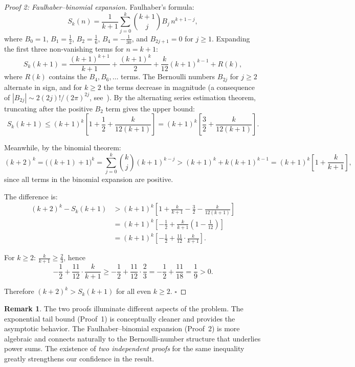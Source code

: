 \documentclass[12pt,a4paper]{article}
\theoremstyle{plain}
\theoremstyle{definition}
\newtheorem{remark}[theorem]{Remark}
\begin{document}
\begin{proof}[Proof 2: Faulhaber--binomial expansion]
  Faulhaber's formula:
  \[
    S_k(n) = \frac{1}{k+1} \sum_{j=0}^{k} \binom{k+1}{j} B_j \, n^{k+1-j},
  \]
  where $B_0 = 1$, $B_1 = \frac{1}{2}$, $B_2 = \frac{1}{6}$, $B_4 = -\frac{1}{30}$,
  and $B_{2j+1} = 0$ for $j \ge 1$.  Expanding the first three non-vanishing
  terms for $n = k+1$:
  \[
    S_k(k+1) = \frac{(k+1)^{k+1}}{k+1}
             + \frac{(k+1)^k}{2}
             + \frac{k}{12}(k+1)^{k-1} + R(k),
  \]
  where $R(k)$ contains the $B_4, B_6, \dots$ terms.  The Bernoulli numbers
  $B_{2j}$ for $j \ge 2$ alternate in sign, and for $k \ge 2$ the terms
  decrease in magnitude (a consequence of $|B_{2j}| \sim
  2(2j)!/(2\pi)^{2j}$, see~\cite{Euler}).  By the alternating series
  estimation theorem, truncating after the positive $B_2$ term gives the upper bound:
  \[
    S_k(k+1) \le (k+1)^k
      \left[1 + \frac{1}{2} + \frac{k}{12(k+1)}\right]
    = (k+1)^k \left[\frac{3}{2} + \frac{k}{12(k+1)}\right].
  \]

  Meanwhile, by the binomial theorem:
  \[
    (k+2)^k = \bigl((k+1) + 1\bigr)^k
    = \sum_{j=0}^{k} \binom{k}{j} (k+1)^{k-j}
    > (k+1)^k + k(k+1)^{k-1}
    = (k+1)^k \left[1 + \frac{k}{k+1}\right],
  \]
  since all terms in the binomial expansion are positive.

  The difference is:
  \begin{align*}
    (k+2)^k - S_k(k+1)
    &> (k+1)^k \left[1 + \frac{k}{k+1}
                      - \frac{3}{2}
                      - \frac{k}{12(k+1)}\right] \\[4pt]
    &= (k+1)^k \left[-\frac{1}{2}
                      + \frac{k}{k+1}\!\left(1 - \frac{1}{12}\right)\right] \\[4pt]
    &= (k+1)^k \left[-\frac{1}{2}
                      + \frac{11}{12} \cdot \frac{k}{k+1}\right].
  \end{align*}

  For $k \ge 2$: $\frac{k}{k+1} \ge \frac{2}{3}$, hence
  \[
    -\frac{1}{2} + \frac{11}{12} \cdot \frac{k}{k+1}
    \ge -\frac{1}{2} + \frac{11}{12} \cdot \frac{2}{3}
    = -\frac{1}{2} + \frac{11}{18}
    = \frac{1}{9} > 0.
  \]

  Therefore $(k+2)^k > S_k(k+1)$ for all even $k \ge 2$.
  \hfill$\square$
\end{proof}

\begin{remark}
  The two proofs illuminate different aspects of the problem.  The
  exponential tail bound (Proof~1) is conceptually cleaner and provides
  the asymptotic behavior.  The Faulhaber--binomial expansion (Proof~2)
  is more algebraic and connects naturally to the Bernoulli-number
  structure that underlies power sums.  The existence of \emph{two
  independent proofs} for the same inequality greatly strengthens our
  confidence in the result.
\end{remark}
\end{document}
